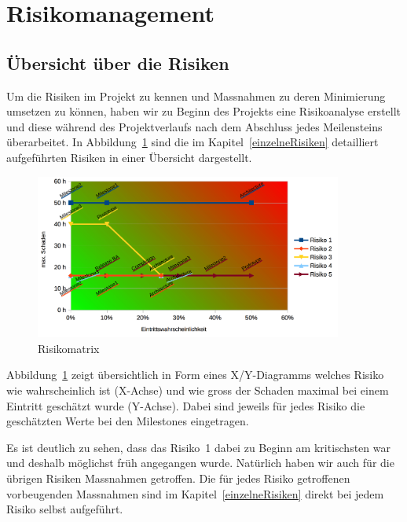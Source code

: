 \chapter*{Risikomanagement}
	
	\label{risiken}
	
	\section*{Übersicht über die Risiken}
		Um die Risiken im Projekt zu kennen und Massnahmen zu deren Minimierung umsetzen zu können, haben wir zu Beginn des Projekts eine Risikoanalyse erstellt und diese während des Projektverlaufs nach dem Abschluss jedes Meilensteins überarbeitet.
		In Abbildung~\ref{fig:RiskMatrix} sind die im Kapitel~\ref{einzelneRisiken} detailliert aufgeführten Risiken in einer Übersicht dargestellt.
		
		\begin{figure}[H]
			\includegraphics[width=0.9\textwidth]{projectPlan/media/img/risikomatrix.png}
			\centering
			\caption{Risikomatrix}
			\label{fig:RiskMatrix}
		\end{figure}
	
		Abbildung~\ref{fig:RiskMatrix} zeigt übersichtlich in Form eines X/Y-Diagramms welches Risiko wie wahrscheinlich ist (X-Achse) und wie gross der Schaden maximal bei einem Eintritt geschätzt wurde (Y-Achse).
		Dabei sind jeweils für jedes Risiko die geschätzten Werte bei den Milestones eingetragen.
		
		Es ist deutlich zu sehen, dass das Risiko~1 dabei zu Beginn am kritischsten war und deshalb möglichst früh angegangen wurde.
		Natürlich haben wir auch für die übrigen Risiken Massnahmen getroffen.
		Die für jedes Risiko getroffenen vorbeugenden Massnahmen sind im Kapitel~\ref{einzelneRisiken} direkt bei jedem Risiko selbst aufgeführt.
	

